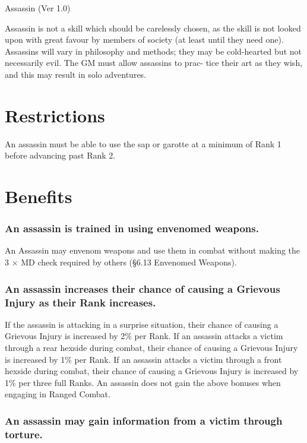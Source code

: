 \begin{Chapter}{Assassin (Ver 1.0)}

Assassin is not a skill which should be carelessly chosen, as the
skill is not looked upon with great favour by members of society (at
least until they need one).  Assassins will vary in philosophy and
methods; they may be cold-hearted but not necessarily evil.  The GM
must allow assassins to prac- tice their art as they wish, and this
may result in solo adventures.

\section{Restrictions}

An assassin must be able to use the sap or garotte at a minimum of
Rank 1 before advancing past Rank 2.

\section{Benefits}

\subsubsection{An assassin is trained in using envenomed weapons.}

An Assassin may envenom weapons and use them in combat without making
the 3 × MD check required by others (§6.13 Envenomed Weapons).

\subsubsection{An assassin increases their chance of causing a Grievous Injury as
their Rank increases.}

If the assassin is attacking in a surprise situation, their chance of
causing a Grievous Injury is increased by 2\% per Rank.  If an
assassin attacks a victim through a rear hexside during combat, their
chance of causing a Grievous Injury is increased by 1\% per Rank.  If
an assassin attacks a victim through a front hexside during combat,
their chance of causing a Grievous Injury is increased by 1\% per
three full Ranks. An assassin does not gain the above bonuses when
engaging in Ranged Combat.


\subsubsection{An assassin may gain information from a victim through torture.}


\end{Chapter}

